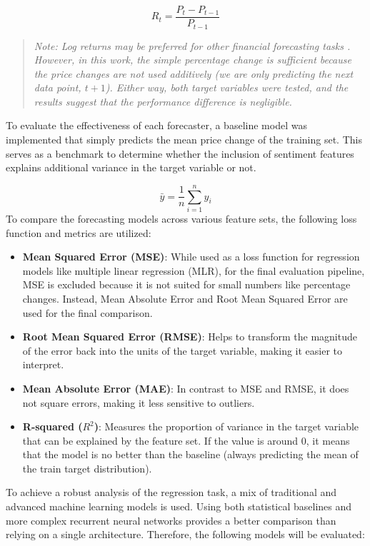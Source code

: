\documentclass[Master,english,IEEE]{twbook}
\begin{document}
$$R_t = \frac{P_t - P_{t-1}}{P_{t-1}}$$

\begin{quote}
\small \textit{Note: Log returns may be preferred for other financial forecasting tasks \cite{fama1965behavior}. However, in this work, the simple percentage change is sufficient because the price changes are not used additively (we are only predicting the next data point, $t+1$). Either way, both target variables were tested, and the results suggest that the performance difference is negligible.}
\end{quote}

To evaluate the effectiveness of each forecaster, a baseline model was implemented that simply predicts the mean price change of the training set. This serves as a benchmark to determine whether the inclusion of sentiment features explains additional variance in the target variable or not.

$$\bar{y} = \frac{1}{n} \sum_{i=1}^{n} y_i$$
To compare the forecasting models across various feature sets, the following loss function and metrics are utilized:
\begin{itemize}
    \item \textbf{Mean Squared Error (MSE)}: While used as a loss function for regression models like multiple linear regression (MLR), for the final evaluation pipeline, MSE is excluded because it is not suited for small numbers like percentage changes. Instead, Mean Absolute Error and Root Mean Squared Error are used for the final comparison.
    \item \textbf{Root Mean Squared Error (RMSE)}: Helps to transform the magnitude of the error back into the units of the target variable, making it easier to interpret.
    \item \textbf{Mean Absolute Error (MAE)}: In contrast to MSE and RMSE, it does not square errors, making it less sensitive to outliers.
    \item \textbf{R-squared ($R^2$)}: Measures the proportion of variance in the target variable that can be explained by the feature set. If the value is around 0, it means that the model is no better than the baseline (always predicting the mean of the train target distribution).
\end{itemize}

To achieve a robust analysis of the regression task, a mix of traditional and advanced machine learning models is used. Using both statistical baselines and more complex recurrent neural networks provides a better comparison than relying on a single architecture. Therefore, the following models will be evaluated:
\end{document}
